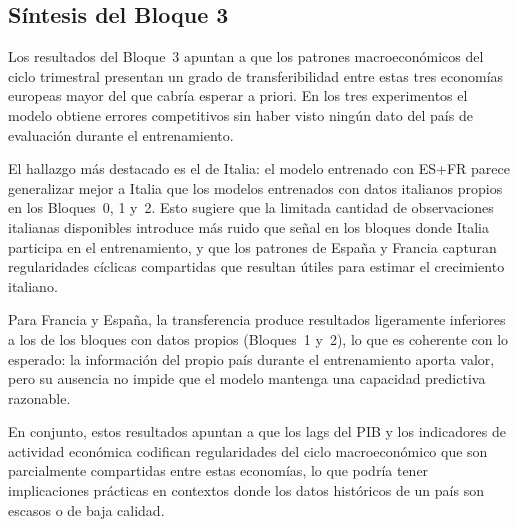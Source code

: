 \FloatBarrier
\subsection{Síntesis del Bloque 3}

Los resultados del Bloque~3 apuntan a que los patrones macroeconómicos del ciclo
trimestral presentan un grado de transferibilidad entre estas tres economías europeas
mayor del que cabría esperar a priori. En los tres experimentos el modelo obtiene errores
competitivos sin haber visto ningún dato del país de evaluación durante el entrenamiento.

El hallazgo más destacado es el de Italia: el modelo entrenado con ES+FR parece generalizar
mejor a Italia que los modelos entrenados con datos italianos propios en los Bloques~0,
1 y~2. Esto sugiere que la limitada cantidad de observaciones italianas disponibles
introduce más ruido que señal en los bloques donde Italia participa en el entrenamiento,
y que los patrones de España y Francia capturan regularidades cíclicas compartidas que
resultan útiles para estimar el crecimiento italiano.

Para Francia y España, la transferencia produce resultados ligeramente inferiores a los
de los bloques con datos propios (Bloques~1 y~2), lo que es coherente con lo esperado:
la información del propio país durante el entrenamiento aporta valor, pero su ausencia
no impide que el modelo mantenga una capacidad predictiva razonable.

En conjunto, estos resultados apuntan a que los lags del PIB y los indicadores de
actividad económica codifican regularidades del ciclo macroeconómico que son
parcialmente compartidas entre estas economías, lo que podría tener implicaciones
prácticas en contextos donde los datos históricos de un país son escasos o de baja
calidad.
